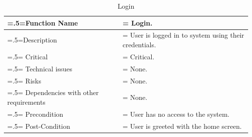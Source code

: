 \begin{center}
    \begin{table}[H]
        \caption{Login}
        \begin{tabularx}{\textwidth} {
                | >{\raggedright\arraybackslash\hsize=.5\hsize\linewidth=\hsize}X
                | >{\raggedright\arraybackslash\hsize=1.5\hsize\linewidth=\hsize}X |}
            \hline
            Function Name                        & Login.                                               \\ \hline
            Description                          & User is logged in to system using their credentials. \\ \hline
            Critical                             & Critical.                                            \\ \hline
            Technical issues                     & None.                                                \\ \hline
            Risks                                & None.                                                \\ \hline
            Dependencies with other requirements & None.                                                \\ \hline
            Precondition                         & User has no access to the system.                    \\ \hline
            Post-Condition                       & User is greeted with the home screen.                \\ \hline
        \end{tabularx}
    \end{table}
\end{center}

